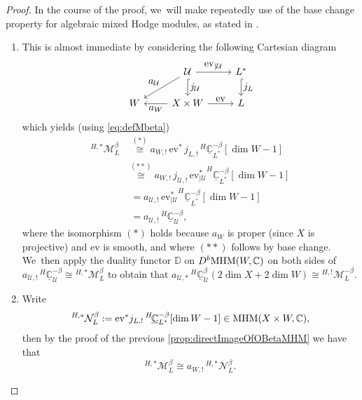 \documentclass[JEP,XML,SOM,Unicode,published]{cedram}
\let\mathds\mathbb
\let\ts\textstyle
\newcommand{\ev}{\mathrm{ev}}
\newcommand{\dC}{{\mathds C}}\let\C\dC
\newcommand{\bD}{{\mathbb D}}\let\mbd\bD
\newcommand{\cM}{\mathcal{M}}
\newcommand{\cN}{\mathcal{N}}
\newcommand{\cU}{\mathcal{U}}\let\mcu\cU
\newcommand{\MHM}{\textup{MHM}}
\newcommand{\Mh}{{^{H,*}}\cM_L^\beta}
\newcommand{\MhD}{{^{H,!}}\cM_L^{-\beta}}
\newcommand{\Nh}{{^{H,*}}\cN_L^\beta}
\begin{document}
\begin{proof}

In the course of the proof, we~will make repeatedly use of the base change property for algebraic mixed Hodge modules, as stated in \cite[\S 4.4.3]{SaitoMHM}.
\begin{enumerate}
\item
This is almost immediate by considering the following Cartesian diagram
\[
\begin{tikzcd}
& \cU \ar{r}{\ts \ev_{|\cU}} \ar[hook]{d}{\ts j_{\cU}} \ar[swap]{ld}{\ts a_\cU} & L^* \ar[hook]{d}{\ts j_{L}}\\
W & X\times W \ar{r}{\ts \ev} \ar{l}{\ts a_W} & L
\end{tikzcd}
\]
which yields (using \eqref{eq:defMbeta})
\begin{align*}
\Mh
&\,\stackrel{(*)}{\cong}
a_{W,!}\, \ev^*\,{j_{L,!}}\, ^{H\!}\underline{\dC}^{-\beta}_{L^{*}}[\dim W-1]\\
&\stackrel{(**)}{\cong}
a_{W,!}\, j_{\cU,!}\, {\ev_{|\cU}^*} ^{H\!}\underline{\dC}^{-\beta}_{L^{*}}[\dim W -1] \\
&\;=
a_{\cU,!}\, {\ev_{|\cU}^*} ^{H\!}\underline{\dC}^{-\beta}_{L^{*}}[\dim W -1]\\
&\;=
{a_{\cU,!}}\, ^{H\!}\underline{\dC}^{-\beta}_{\cU},
\end{align*}
where the isomorphism $(*)$ holds because $a_W$ is proper (since $X$ is projective)
and $\ev$ is smooth, and where $(**)$ follows by base change. We~then apply the duality functor $\bD$ on $D^b\MHM(W,\dC)$ on both sides of
$a_{\cU,!} \, ^{H\!}\underline{\dC}^{-\beta}_{\cU}\cong \Mh$ to obtain that $a_{\cU,*} \, ^{H\!}\underline{\dC}^{\beta}_{\cU}(2\dim X + 2\dim W)
\cong \MhD$.
\item
Write
\[
\Nh:=\ev^* j_{L,!}\, ^{H\!}\underline{\dC}^{-\beta}_{L^{*}}[\dim W-1] \in \MHM(X\times W,\dC),
\]
then by the proof of the previous
\cref{prop:directImageOfOBetaMHM} we have that
\[
\Mh \cong a_{W,!}\, \Nh.
\]


\end{enumerate}
\end{proof}
\end{document}
